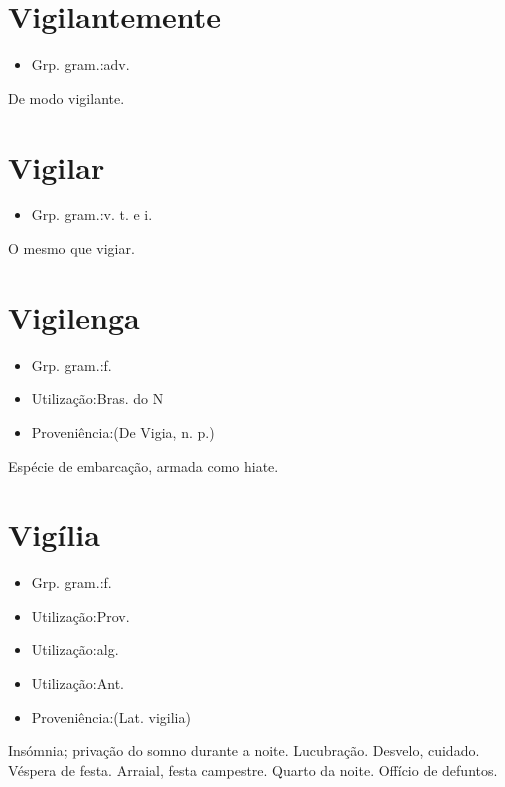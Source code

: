 \documentclass{article}
\begin{document}
\section{Vigilantemente}
\begin{itemize}
\item {Grp. gram.:adv.}
\end{itemize}
De modo vigilante.
\section{Vigilar}
\begin{itemize}
\item {Grp. gram.:v. t.  e  i.}
\end{itemize}
O mesmo que \textunderscore vigiar\textunderscore .
\section{Vigilenga}
\begin{itemize}
\item {Grp. gram.:f.}
\end{itemize}
\begin{itemize}
\item {Utilização:Bras. do N}
\end{itemize}
\begin{itemize}
\item {Proveniência:(De \textunderscore Vigia\textunderscore , n. p.)}
\end{itemize}
Espécie de embarcação, armada como hiate.
\section{Vigília}
\begin{itemize}
\item {Grp. gram.:f.}
\end{itemize}
\begin{itemize}
\item {Utilização:Prov.}
\end{itemize}
\begin{itemize}
\item {Utilização:alg.}
\end{itemize}
\begin{itemize}
\item {Utilização:Ant.}
\end{itemize}
\begin{itemize}
\item {Proveniência:(Lat. \textunderscore vigilia\textunderscore )}
\end{itemize}
Insómnia; privação do somno durante a noite.
Lucubração.
Desvelo, cuidado.
Véspera de festa.
Arraial, festa campestre.
Quarto da noite.
Offício de defuntos.
\end{document}
